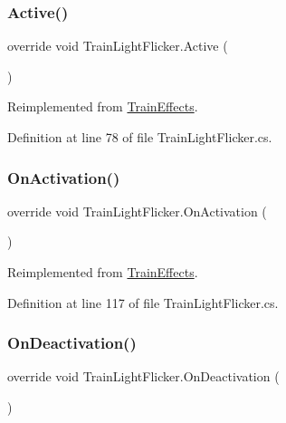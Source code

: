 \subsubsection{\texorpdfstring{Active()}{Active()}}
{\footnotesize\ttfamily override void Train\+Light\+Flicker.\+Active (\begin{DoxyParamCaption}{ }\end{DoxyParamCaption})\hspace{0.3cm}{\ttfamily [virtual]}}



Reimplemented from \mbox{\hyperlink{class_train_effects_a444cb0c6444a8945f5e1a7f02dc83b99}{Train\+Effects}}.



Definition at line 78 of file Train\+Light\+Flicker.\+cs.

\mbox{\label{class_train_light_flicker_ac3959dac6aa192f03d493625d28a14de}} 
\subsubsection{\texorpdfstring{On\+Activation()}{OnActivation()}}
{\footnotesize\ttfamily override void Train\+Light\+Flicker.\+On\+Activation (\begin{DoxyParamCaption}{ }\end{DoxyParamCaption})\hspace{0.3cm}{\ttfamily [virtual]}}



Reimplemented from \mbox{\hyperlink{class_train_effects_ad77aba799a5d19a141128639a4bebcad}{Train\+Effects}}.



Definition at line 117 of file Train\+Light\+Flicker.\+cs.

\mbox{\label{class_train_light_flicker_aa1f0646e2c9224f0765ab172515490ee}} 
\subsubsection{\texorpdfstring{On\+Deactivation()}{OnDeactivation()}}
{\footnotesize\ttfamily override void Train\+Light\+Flicker.\+On\+Deactivation (\begin{DoxyParamCaption}{ }\end{DoxyParamCaption})\hspace{0.3cm}{\ttfamily [virtual]}}



